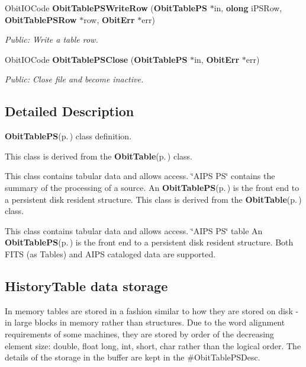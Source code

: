 \begin{CompactItemize}
Obit\-IOCode {\bf Obit\-Table\-PSWrite\-Row} ({\bf Obit\-Table\-PS} $\ast$in, {\bf olong} i\-PSRow, {\bf Obit\-Table\-PSRow} $\ast$row, {\bf Obit\-Err} $\ast$err)
\begin{CompactList}\small\item\em Public: Write a table row. \item\end{CompactList}\item 
Obit\-IOCode {\bf Obit\-Table\-PSClose} ({\bf Obit\-Table\-PS} $\ast$in, {\bf Obit\-Err} $\ast$err)
\begin{CompactList}\small\item\em Public: Close file and become inactive. \item\end{CompactList}\end{CompactItemize}


\subsection{Detailed Description}
{\bf Obit\-Table\-PS}{\rm (p.\,\pageref{structObitTablePS})} class definition. 

This class is derived from the {\bf Obit\-Table}{\rm (p.\,\pageref{structObitTable})} class.

This class contains tabular data and allows access. \char`\"{}AIPS PS\char`\"{} contains the summary of the processing of a source. An {\bf Obit\-Table\-PS}{\rm (p.\,\pageref{structObitTablePS})} is the front end to a persistent disk resident structure. This class is derived from the {\bf Obit\-Table}{\rm (p.\,\pageref{structObitTable})} class.

This class contains tabular data and allows access. \char`\"{}AIPS PS\char`\"{} table An {\bf Obit\-Table\-PS}{\rm (p.\,\pageref{structObitTablePS})} is the front end to a persistent disk resident structure. Both FITS (as Tables) and AIPS cataloged data are supported.\subsection{History\-Table data storage}\label{ObitTableWX_8h_TableDataStorage}
In memory tables are stored in a fashion similar to how they are stored on disk - in large blocks in memory rather than structures. Due to the word alignment requirements of some machines, they are stored by order of the decreasing element size: double, float long, int, short, char rather than the logical order. The details of the storage in the buffer are kept in the \#Obit\-Table\-PSDesc.

